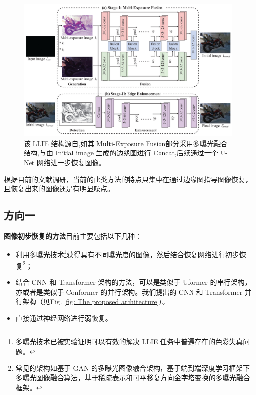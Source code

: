 \documentclass[a4paper, 10pt]{article}
\begin{document}
	\begin{figure}[htbp]
		\centering 
		\includegraphics[width=\columnwidth]{picture/LLIE/EEMEFN/EEMEFN framework}
		\caption{
			\label{fig: EEMEFN} 
			该 LLIE 结构源自\cite{zhu2020eemefn},如其 Multi-Exposure Fusion部分采用多曝光融合结构,与由 Initial image 生成的边缘图进行 Concat,后续通过一个 U-Net 网络进一步恢复图像。
		}
	\end{figure}
	
	根据目前的文献调研，当前的此类方法的特点只集中在通过边缘图指导图像恢复，且恢复出来的图像还是有明显噪点。
	
	\subsection{方向一}
	
	\textbf{图像初步恢复的方法}目前主要包括以下几种：
	
	\begin{itemize}
		\item[(1)] 
		利用多曝光技术\footnote{多曝光技术已被实验证明可以有效的解决 LLIE 任务中普遍存在的色彩失真问题。}获得具有不同曝光度的图像，然后结合恢复网络进行初步恢复\footnote{常见的架构如基于 GAN 的多曝光图像融合架构，基于端到端深度学习框架下多曝光图像融合算法，基于稀疏表示和可平移复方向金字塔变换的多曝光融合框架。}；
		
		\item[(2)]
		结合 CNN 和 Transformer 架构的方法，可以是类似于 Uformer \cite{wang2022uformer}的串行架构，亦或者是类似于 Conformer 的并行架构。我们提出的 CNN 和 Transformer 并行架构（见Fig. \ref{fig: The proposed architecture}）。
		
		\item[(3)]
		直接通过神经网络进行弱恢复。
		
	\end{itemize}	
	
\end{document}
